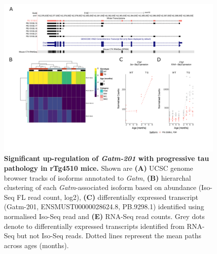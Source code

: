 \begin{landscape}
	\begin{figure}[!htp]
		\centering
		\includegraphics[page=3,trim={1.5cm 3.5cm 2cm 1cm}, scale = 0.85]{Figures/Ch5_DiffPlots_Landscape.pdf}
		\captionsetup{width=1.5\textwidth}
		\caption[Differential \textit{Gatm} transcript expression]%
		{\textbf{Significant up-regulation of \textit{Gatm-201} with progressive tau pathology in rTg4510 mice.} Shown are \textbf{(A)} UCSC genome browser tracks of isoforms annotated to \textit{Gatm}, \textbf{(B)} hierarchal clustering of each \textit{Gatm}-associated isoform based on abundance (Iso-Seq FL read count, log2), \textbf{(C)} differentially expressed transcript (Gatm-201, ENSMUST00000028624.8, PB.9298.1) identified using normalised Iso-Seq read and \textbf{(E)} RNA-Seq read counts. Grey dots denote to differentially expressed transcripts identified from RNA-Seq but not Iso-Seq reads. Dotted lines represent the mean paths across ages (months).}   
		\label{fig:Gatm}
	\end{figure}	
\end{landscape}

